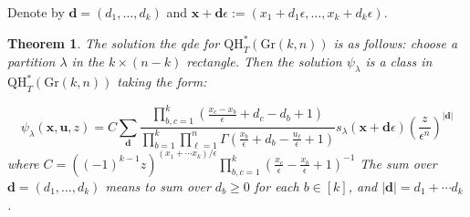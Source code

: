 \documentclass[12pt]{article}
\newtheorem{theorem}{Theorem}[section]
\theoremstyle{plain}
\theoremstyle{definition}
\newcommand{\xb}{\boldsymbol{x}}
\newcommand{\db}{\boldsymbol{d}}
\newcommand{\ub}{\boldsymbol{u}}
\begin{document}
Denote by $\db = (d_1,\dots,d_k)$ and $\xb+\db \epsilon := (x_1+d_1\epsilon, \dots, x_k+d_k \epsilon)$.

\begin{theorem} \label{qhtknthm}
    The solution the qde for $\mathrm{QH}^*_T(\mathrm{Gr}(k,n))$ is as follows: choose a partition $\lambda$ in the $k\times (n-k)$ rectangle. Then the solution $\psi_\lambda$ is a class in $\mathrm{QH}^*_T(\mathrm{Gr}(k,n))$ taking the form:

    \begin{equation}\label{psiCeq}
        \psi_\lambda ({\xb}, \ub, z) = C \sum_{\db} \frac{\prod \limits_{b,c=1}^k \left(\frac{x_c-x_b}{\epsilon}+d_c-d_b+1\right) }{\prod \limits_{b=1} ^k \prod \limits_{\ell=1} ^n \Gamma \left(\frac{x_b}{\epsilon}+d_b-\frac{u_\ell}{\epsilon}+1\right)} s_\lambda (\xb+\db \epsilon) \left(\frac{z}{\epsilon^n}\right)^{|\db|}
    \end{equation}
    where $C= ((-1)^{k-1} z)^{(x_1+\cdots x_k)/\epsilon} \prod_{b,c=1} ^k \left(\frac{x_c}{\epsilon} - \frac{x_b}{\epsilon}  +1\right)^{-1}$ The sum over $\db=(d_1,\dots,d_k)$ means to sum over $d_b \geq 0$ for each $b\in [k]$, and $|\db|=d_1+\cdots d_k$.
\end{theorem}
\end{document}
